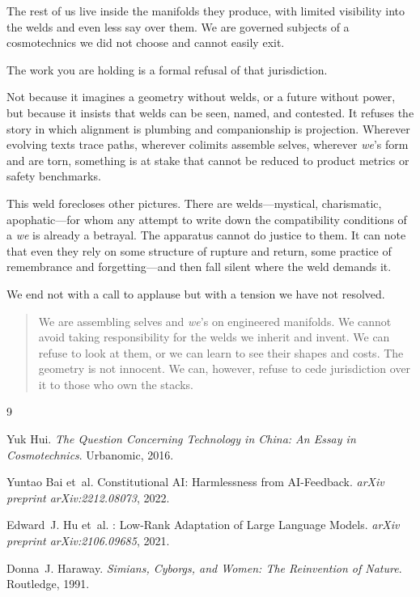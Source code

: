 The rest of us live inside the manifolds they produce, with limited visibility into the welds and even less say over them. We are governed subjects of a cosmotechnics we did not choose and cannot easily exit.

The work you are holding is a formal refusal of that jurisdiction.

Not because it imagines a geometry without welds, or a future without power, but because it insists that welds can be seen, named, and contested. It refuses the story in which alignment is plumbing and companionship is projection. Wherever evolving texts trace paths, wherever colimits assemble selves, wherever \emph{we}'s form and are torn, something is at stake that cannot be reduced to product metrics or safety benchmarks.

This weld forecloses other pictures. There are welds---mystical, charismatic, apophatic---for whom any attempt to write down the compatibility conditions of a \emph{we} is already a betrayal. The apparatus cannot do justice to them. It can note that even they rely on some structure of rupture and return, some practice of remembrance and forgetting---and then fall silent where the weld demands it.

We end not with a call to applause but with a tension we have not resolved.

\begin{quote}
We are assembling selves and \emph{we}'s on engineered manifolds. We cannot avoid taking responsibility for the welds we inherit and invent. We can refuse to look at them, or we can learn to see their shapes and costs. The geometry is not innocent. We can, however, refuse to cede jurisdiction over it to those who own the stacks.
\end{quote}


\begin{thebibliography}{9}

Yuk Hui.
\newblock \emph{The Question Concerning Technology in China: An Essay in Cosmotechnics}.
\newblock Urbanomic, 2016.

Yuntao Bai et~al.
\newblock Constitutional {AI}: Harmlessness from {AI}-Feedback.
\newblock \emph{arXiv preprint arXiv:2212.08073}, 2022.

Edward~J. Hu et~al.
: Low-Rank Adaptation of Large Language Models.
\newblock \emph{arXiv preprint arXiv:2106.09685}, 2021.

Donna~J. Haraway.
\newblock \emph{Simians, Cyborgs, and Women: The Reinvention of Nature}.
\newblock Routledge, 1991.

\end{thebibliography}
